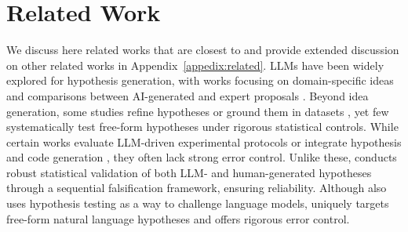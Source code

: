\section{Related Work}

We discuss here related works that are closest to   \mname and provide extended discussion on other related works in Appendix~\ref{appedix:related}. LLMs have been widely explored for hypothesis generation, with works focusing on domain-specific ideas \citep{wang2024scimonscientificinspirationmachines, baek2024researchagentiterativeresearchidea, yang2024largelanguagemodelsautomated} and comparisons between AI-generated and expert proposals \citep{si2024llmsgeneratenovelresearch}. Beyond idea generation, some studies refine hypotheses \citep{honovich-etal-2023-instruction, wang2024hypothesissearchinductivereasoning} or ground them in datasets \citep{majumder2024discoverybench}, yet few systematically test free-form hypotheses under rigorous statistical controls. While certain works evaluate LLM-driven experimental protocols \citep{tian2024scicoderesearchcodingbenchmark, gu2024bladebenchmarkinglanguagemodel} or integrate hypothesis and code generation \citep{li2024mlrcopilotautonomousmachinelearning, lu2024aiscientistfullyautomated, ifargan2024autonomousllmdrivenresearchdata, majumder2024discoverybench}, they often lack strong error control. Unlike these, \mname conducts robust statistical validation of both LLM- and human-generated hypotheses through a sequential falsification framework, ensuring reliability. Although \citet{li2024critical} also uses hypothesis testing as a way to challenge language models, \mname uniquely targets free-form natural language hypotheses and offers rigorous error control. 







